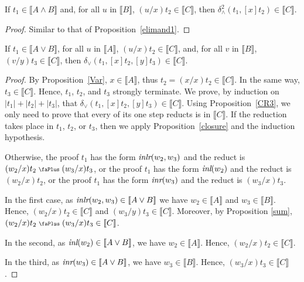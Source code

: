 \documentclass[screen, sigconf,authorversion,nonacm]{acmart}
\theoremstyle{acmdefinition}
\numberwithin{equation}{section}
\newcommand\abstr[1]{[#1]}
\newcommand\inl{\mbox{\it inl}}
\newcommand\inr{\mbox{\it inr}}
\newcommand\inlr{\mbox{\it inlr}}
\newcommand\elimand{\delta_{\wedge}}
\newcommand\elimor{\delta_{\vee}}
\newcommand\plus{\mathrel{\text{\normalfont\scalebox{0.7}{\faPlus}}}}
\begin{document}
\begin{proposition}[Adequacy of $\elimand^2$]
\label{elimand2}
If $t_1 \in \llbracket A \wedge B \rrbracket$ and,
for all $u$ in $\llbracket B \rrbracket$, 
$(u/x)t_2 \in \llbracket C \rrbracket $, 
then $\elimand^2(t_1,\abstr{x}t_2) \in \llbracket C \rrbracket$.
\end{proposition}

\begin{proof}
Similar to that of Proposition~\ref{elimand1}.
\qedhere
\end{proof}

\begin{proposition}[Adequacy of $\elimor$]
\label{elimor}
If $t_1 \in \llbracket A \vee B \rrbracket$, for all $u$ in $\llbracket A
\rrbracket$, $(u/x)t_2 \in \llbracket C \rrbracket $, and, for all $v$
in $\llbracket B \rrbracket$, $(v/y)t_3 \in \llbracket C \rrbracket $,
then $\elimor(t_1, \abstr{x}t_2, \abstr{y}t_3) \in \llbracket C \rrbracket$.
\end{proposition}

\begin{proof}
By Proposition~\ref{Var}, $x \in \llbracket A \rrbracket$, thus $t_2 =
(x/x)t_2 \in \llbracket C \rrbracket$. In the same way, $t_3 \in
\llbracket C \rrbracket$.  Hence, $t_1$, $t_2$, and $t_3$ strongly
terminate.  We prove, by induction on $|t_1| + |t_2| + |t_3|$, that
$\elimor(t_1, \abstr{x}t_2, \abstr{y}t_3) \in \llbracket C
\rrbracket$.  Using Proposition~\ref{CR3}, we only need to prove that
every of its one step reducts is in $\llbracket C \rrbracket$.  If the
reduction takes place in $t_1$, $t_2$, or $t_3$, then we apply
Proposition~\ref{closure} and the induction hypothesis.

Otherwise, the proof $t_1$ has the form $\inlr(w_2,w_3)$
and the reduct is $(w_2/x)t_2 \plus (w_3/x)t_3$,
or the proof $t_1$ has the form
$\inl(w_2)$ and the reduct is $(w_2/x)t_2$, or the proof $t_1$ has the form
$\inr(w_3)$ and the reduct is $(w_3/x)t_3$.

  In the first case, as $\inlr(w_2,w_3) \in \llbracket A \vee B \rrbracket$ we
  have $w_2 \in \llbracket A \rrbracket$ and $w_3 \in \llbracket B \rrbracket$.
  Hence, $(w_2/x)t_2 \in \llbracket C \rrbracket$ and $(w_3/y)t_3 \in
  \llbracket C \rrbracket$.  Moreover, by Proposition \ref{sum}, $(w_2/x)t_2
  \plus (w_3/x)t_3 \in \llbracket C \rrbracket$.

In the second, as $\inl(w_2) \in \llbracket A \vee B \rrbracket$, we
have $w_2 \in \llbracket A \rrbracket$.  Hence, $(w_2/x)t_2 \in
\llbracket C \rrbracket$.

In the third, as $\inr(w_3) \in \llbracket A \vee B \rrbracket$, we
have $w_3 \in \llbracket B \rrbracket$.  Hence, $(w_3/x)t_3 \in
\llbracket C \rrbracket$.
\qedhere
\end{proof}
\end{document}
